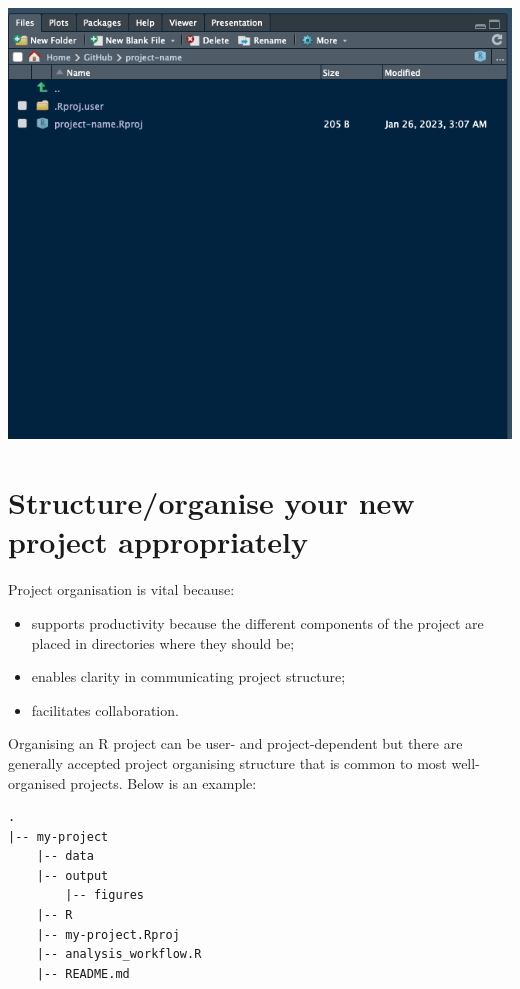 \documentclass[
  12pt,
]{book}
\providecommand{\tightlist}{%
  \setlength{\itemsep}{0pt}\setlength{\parskip}{0pt}}
\begin{document}
\includegraphics{images/new_project6.png}

\hypertarget{structureorganise-your-new-project-appropriately}{%
\section{Structure/organise your new project appropriately}\label{structureorganise-your-new-project-appropriately}}

Project organisation is vital because:

\begin{itemize}
\tightlist
\item
  supports productivity because the different components of the project are placed in directories where they should be;
\item
  enables clarity in communicating project structure;
\item
  facilitates collaboration.
\end{itemize}

Organising an R project can be user- and project-dependent but there are generally accepted project organising structure that is common to most well-organised projects. Below is an example:

\begin{verbatim}
.    
|-- my-project    
    |-- data    
    |-- output    
        |-- figures    
    |-- R    
    |-- my-project.Rproj    
    |-- analysis_workflow.R    
    |-- README.md    
\end{verbatim}
\end{document}
